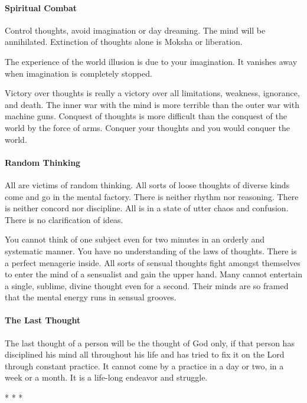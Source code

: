 \paragraph{Spiritual Combat}
Control thoughts, avoid imagination or day dreaming. The mind will be annihilated. Extinction of thoughts alone is Moksha or liberation.

The experience of the world illusion is due to your imagination. It vanishes away when imagination is completely stopped.

Victory over thoughts is really a victory over all limitations, weakness, ignorance, and death. The inner war with the mind is more terrible than the outer war with machine guns. Conquest of thoughts is more difficult than the conquest of the world by the force of arms. Conquer your thoughts and you would conquer the world.

\paragraph{Random Thinking}
All are victims of random thinking. All sorts of loose thoughts of diverse kinds come and go in the mental factory. There is neither rhythm nor reasoning. There is neither concord nor discipline. All is in a state of utter chaos and confusion. There is no clarification of ideas.

You cannot think of one subject even for two minutes in an orderly and systematic manner. You have no understanding of the laws of thoughts. There is a perfect menagerie inside. All sorts of sensual thoughts fight amongst themselves to enter the mind of a sensualist and gain the upper hand. Many cannot entertain a single, sublime, divine thought even for a second. Their minds are so framed that the mental energy runs in sensual grooves.

\paragraph{The Last Thought}
The last thought of a person will be the thought of God only, if that person has disciplined his mind all throughout his life and has tried to fix it on the Lord through constant practice. It cannot come by a practice in a day or two, in a week or a month. It is a life-long endeavor and struggle.




\begin{center}* * *\end{center}

